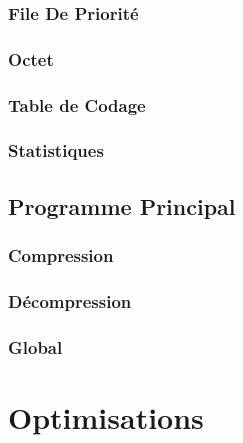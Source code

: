 \documentclass{article}
\begin{document}
\subsubsection{File De Priorité}
	
	\bigskip
\subsubsection{Octet}
	
	\bigskip
\subsubsection{Table de Codage}
	
	\bigskip
\subsubsection{Statistiques}
	
	\bigskip
\subsection{Programme Principal}
\subsubsection{Compression}
	
	\bigskip
\subsubsection{Décompression}
	
	\bigskip
\subsubsection{Global}
	
	\bigskip
\section{Optimisations}
\end{document}
